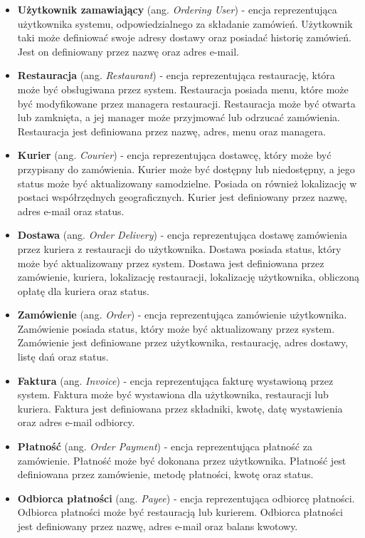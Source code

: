 \begin{itemize}

    \item \textbf{Użytkownik zamawiający} (ang. \textit{Ordering User}) - encja reprezentująca użytkownika systemu, odpowiedzialnego za składanie zamówień. Użytkownik taki może definiować swoje adresy dostawy oraz posiadać historię zamówień. Jest on definiowany przez nazwę oraz adres e-mail.
    \item \textbf{Restauracja} (ang. \textit{Restaurant}) - encja reprezentująca restaurację, która może być obsługiwana przez system. Restauracja posiada menu, które może być modyfikowane przez managera restauracji. Restauracja może być otwarta lub zamknięta, a jej manager może przyjmować lub odrzucać zamówienia. Restauracja jest definiowana przez nazwę, adres, menu oraz managera.
    \item \textbf{Kurier} (ang. \textit{Courier}) - encja reprezentująca dostawcę, który może być przypisany do zamówienia. Kurier może być dostępny lub niedostępny, a jego status może być aktualizowany samodzielne. Posiada on również lokalizację w postaci współrzędnych geograficznych. Kurier jest definiowany przez nazwę, adres e-mail oraz status.
    \item \textbf{Dostawa} (ang. \textit{Order Delivery}) - encja reprezentująca dostawę zamówienia przez kuriera z restauracji do użytkownika. Dostawa posiada status, który może być aktualizowany przez system. Dostawa jest definiowana przez zamówienie, kuriera, lokalizację restauracji, lokalizację użytkownika, obliczoną opłatę dla kuriera oraz status.
    \item \textbf{Zamówienie} (ang. \textit{Order}) - encja reprezentująca zamówienie użytkownika. Zamówienie posiada status, który może być aktualizowany przez system. Zamówienie jest definiowane przez użytkownika, restaurację, adres dostawy, listę dań oraz status.
    \item \textbf{Faktura} (ang. \textit{Invoice}) - encja reprezentująca fakturę wystawioną przez system. Faktura może być wystawiona dla użytkownika, restauracji lub kuriera. Faktura jest definiowana przez składniki, kwotę, datę wystawienia oraz adres e-mail odbiorcy.
    \item \textbf{Płatność} (ang. \textit{Order Payment}) - encja reprezentująca płatność za zamówienie. Płatność może być dokonana przez użytkownika. Płatność jest definiowana przez zamówienie, metodę płatności, kwotę oraz status.
    \item \textbf{Odbiorca płatności} (ang. \textit{Payee}) - encja reprezentująca odbiorcę płatności. Odbiorca płatności może być restauracją lub kurierem. Odbiorca płatności jest definiowany przez nazwę, adres e-mail oraz balans kwotowy.

\end{itemize}
